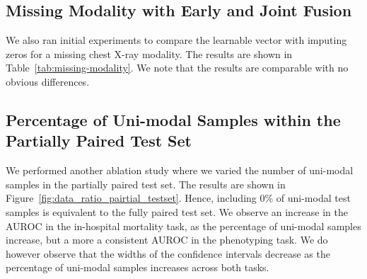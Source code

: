 \documentclass[pmlr]{jmlr}
\begin{document}
\newpage
\subsection{Missing Modality with Early and Joint Fusion} \label{missingtoken}
We also ran initial experiments to compare the learnable vector with imputing zeros for a missing chest X-ray modality. The results are shown in Table~\ref{tab:missing-modality}. We note that the results are comparable with no obvious differences.  


\begin{table*}[h!]
    \centering
    \caption{\textbf{Missing modality with early and joint fusion.} We report the AUROC and AUPRC results on the entire test set ($\mathbf{EHR}_{\mathbf{PARTIAL}}$), including samples with missing chest X-ray images (substituted with a zeros or a learnable vector) All methods below were pre-trained using the ($\mathbf{EHR}_{\mathbf{PARTIAL}}$) training set and a fixed learning rate of 0.0001.} \vspace{-1mm}
    \label{tab:missing-modality}
\end{table*}


\subsection{Percentage of Uni-modal Samples within the Partially Paired Test Set}
\label{unimodalpercPARTIAL}
We performed another ablation study where we varied the number of uni-modal samples in the partially paired test set. The results are shown in Figure~\ref{fig:data_ratio_pairtial_testset}. Hence, including 0\% of uni-modal test samples is equivalent to the fully paired test set. We observe an increase in the AUROC in the in-hospital mortality task, as the percentage of uni-modal samples increase, but a more a consistent AUROC in the phenotyping task. We do however observe that the widths of the confidence intervals decrease as the percentage of uni-modal samples increases across both tasks. 
\end{document}
